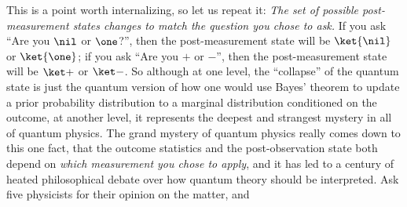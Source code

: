 	    This is a point worth internalizing, so let us repeat it: 
	      \emph{The set of possible post-measurement states changes to match
	      the question you chose to ask.} If you ask ``Are you $\nil$ or $\one$?'', 
	      then the post-measurement state will be $\ket{\nil}$ or $\ket{\one}$; 
	      if you ask ``Are you $+$ or $-$'', then the post-measurement state will
        be $\ket +$ or $\ket -$. 
        So although at one level, the ``collapse'' of the quantum state is just
        the quantum version of how one would use Bayes' theorem 
        to update a prior probability distribution to a marginal distribution
        conditioned on the outcome, at another level, it represents the
        deepest and strangest mystery in all of quantum physics.
        The grand mystery of quantum physics really comes down to this one fact, 
        that the outcome statistics and the post-observation state both depend
        on \emph{which measurement you chose to apply}, and it has led to a century
        of heated philosophical debate over how quantum theory should be
        interpreted. Ask five physicists for their opinion on the matter, and
